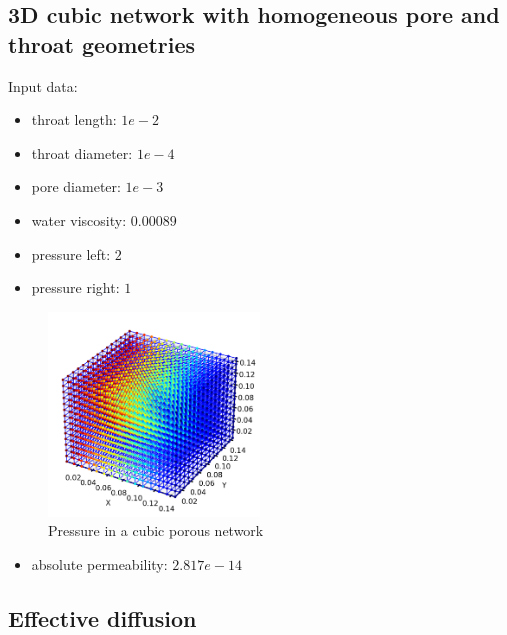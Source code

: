 \documentclass{article}
\begin{document}
\subsection{3D cubic network with homogeneous pore and throat geometries}
Input data:
\begin{itemize}
    \item throat length: $1e-2$
    \item throat diameter: $1e-4$
    \item pore diameter: $1e-3$
    \item water viscosity: $0.00089$
    \item pressure left: $2$
    \item pressure right: $1$
\end{itemize}
\begin{figure}[h]
    \centering
    \includegraphics[width=0.5\textwidth]{images/3DcubicPoreNet.png}
    \caption{Pressure in a cubic porous network}
    \label{fig:3DcubicPN}
\end{figure}
\begin{itemize}
    \item absolute permeability: $2.817e-14$
\end{itemize}

\FloatBarrier  %
\subsection{Effective diffusion}
\end{document}
